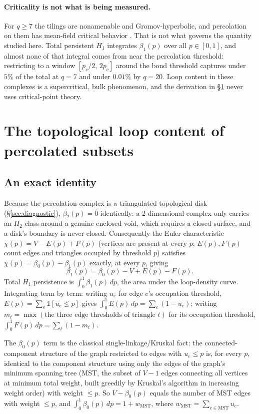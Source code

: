 \documentclass[11pt]{article}
\begin{document}
\paragraph{Criticality is not what is being measured.} For $q\ge7$ the tilings are nonamenable and Gromov-hyperbolic, and percolation on them has mean-field critical behavior \citep{hutchcroft2019,mertens2017}. That is not what governs the quantity studied here. Total persistent $H_1$ integrates $\beta_1(p)$ over all $p\in[0,1]$, and almost none of that integral comes from near the percolation threshold: restricting to a window $[p_c/2,\,2p_c]$ around the bond threshold captures under $5\%$ of the total at $q=7$ and under $0.01\%$ by $q=20$. Loop content in these complexes is a supercritical, bulk phenomenon, and the derivation in \S\ref{sec:partA} never uses critical-point theory.

\section{The topological loop content of percolated subsets}
\label{sec:partA}

\subsection{An exact identity}
\label{sec:identity}

Because the percolation complex is a triangulated topological disk (\S\ref{sec:diagnostic}), $\beta_2(p)=0$ identically: a 2-dimensional complex only carries an $H_2$ class around a genuine enclosed void, which requires a closed surface, and a disk's boundary is never closed. Consequently the Euler characteristic $\chi(p)=V-E(p)+F(p)$ (vertices are present at every $p$; $E(p),F(p)$ count edges and triangles occupied by threshold $p$) satisfies $\chi(p)=\beta_0(p)-\beta_1(p)$ exactly, at every $p$, giving
\[
\beta_1(p) = \beta_0(p) - V + E(p) - F(p).
\]
Total $H_1$ persistence is $\int_0^1\beta_1(p)\,dp$, the area under the loop-density curve. Integrating term by term: writing $u_e$ for edge $e$'s occupation threshold, $E(p)=\sum_e\mathbb{1}[u_e\le p]$ gives $\int_0^1E(p)\,dp=\sum_e(1-u_e)$; writing $m_t=\max(\text{the three edge thresholds of triangle }t)$ for its occupation threshold, $\int_0^1F(p)\,dp=\sum_t(1-m_t)$.

The $\beta_0(p)$ term is the classical single-linkage/Kruskal fact: the connected-component structure of the graph restricted to edges with $u_e\le p$ is, for every $p$, identical to the component structure using only the edges of the graph's minimum spanning tree (MST, the subset of $V-1$ edges connecting all vertices at minimum total weight, built greedily by Kruskal's algorithm in increasing weight order) with weight $\le p$. So $V-\beta_0(p)$ equals the number of MST edges with weight $\le p$, and $\int_0^1\beta_0(p)\,dp = 1+w_{\mathrm{MST}}$, where $w_{\mathrm{MST}}=\sum_{e\in\mathrm{MST}}u_e$.
\end{document}
